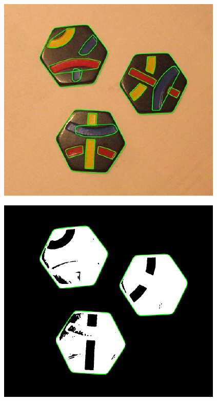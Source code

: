 \documentclass[10pt]{article}
\begin{document}
	\begin{figure}[h]
		\begin{minipage}[h]{0.19\linewidth}
			\begin{center}
				{\includegraphics[width=1.0\linewidth]{data/contour_exampler.pdf}}
			\end{center}
		\end{minipage}
		\hfill
		\begin{minipage}[h]{0.19\linewidth}
			\begin{center}
				{\includegraphics[width=1.0\linewidth]{data/hex_example.pdf}}

\end{center}
\end{minipage}
\end{figure}
\end{document}
